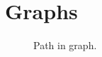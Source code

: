 \section{Graphs}

\begin{figure}[tbp]
  
  \caption{Path in graph.}
  \label{fig:bs:graphs:weighted}
\end{figure}
